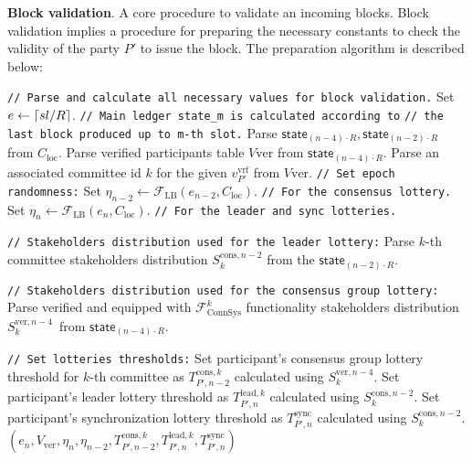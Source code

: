\textbf{Block validation}.\label{apndx:prepare-block-validation}
A core procedure to validate an incoming blocks.
Block validation implies a procedure for preparing the necessary constants to check the validity of the party $P'$ to issue the block.
The preparation algorithm is described below:
\begin{algo}
    \caption{$\textsf{prepareForBlockValidation}(sl, R, C_{\text{loc}}, v_{P'}^{\text{vrf}})$}
    \begin{algorithmic}[1]
        \noindent
        \lstinline|// Parse and calculate all necessary values for block validation.|
        \State Set $e \leftarrow \lceil sl/\\R \rceil$.
        \noindent
        \lstinline|// Main ledger state_m is calculated according to|
        \noindent
        \lstinline|// the last block produced up to m-th slot.|
        \State Parse $\textsf{state}_{(n - 4)\cdot R}, \textsf{state}_{(n - 2)\cdot R}$ from $C_{\text{loc}}$.
        \State Parse verified participants table $V{\text{ver}}$ from $\textsf{state}_{(n - 4)\cdot R}$.
        \State Parse an associated committee id $k$ for the given $v_{P'}^{\text{vrf}}$ from $V{\text{ver}}$.
        \noindent
        \lstinline|// Set epoch randomness:|
        \State Set ${\eta_{n-2} \leftarrow \mathcal{F}_{\text{LB}}(e_{n-2}, C_{\text{loc}})}$. \lstinline|// For the consensus lottery.|
        \State Set ${\eta_{n} \leftarrow \mathcal{F}_{\text{LB}}(e_{n}, C_{\text{loc}})}$. \lstinline|// For the leader and sync lotteries.|

        \noindent
        \lstinline|// Stakeholders distribution used for the leader lottery:|
        \State Parse $k$-th committee stakeholders distribution $S_k^{\text{cons}, n - 2}$ from the $\textsf{state}_{(n - 2)\cdot R}$.

        \noindent
        \lstinline|// Stakeholders distribution used for the consensus group lottery:|
        \State Parse verified and equipped with $\mathcal{F}^k_{\text{ConnSys}}$ functionality stakeholders distribution $S_k^{\text{ver}, {n - 4}}$\
        from $\textsf{state}_{(n - 4)\cdot R}$.

        \noindent
        \lstinline|// Set lotteries thresholds:|
        \State Set participant's consensus group lottery threshold for $k$-th committee as $T_{P', n-2}^{\text{cons}, k}$ calculated using $S_k^{\text{ver}, {n - 4}}$.
        \State Set participant's leader lottery threshold as $T_{P', n}^{\text{lead}, k}$ calculated using $S_k^{\text{cons}, {n - 2}}$.
        \State Set participant's synchronization lottery threshold as $T_{P', n}^{\text{sync}}$ calculated using $S_k^{\text{cons}, {n - 2}}$.
        \State \Return ${(e_n, V_{\text{ver}}, \eta_{n}, \eta_{n - 2}, T_{P', n-2}^{\text{cons}, k}, T_{P', n}^{\text{lead}, k}, T_{P', n}^{\text{sync}})}$
    \end{algorithmic}\label{alg:prepare-block-validation}
\end{algo}

